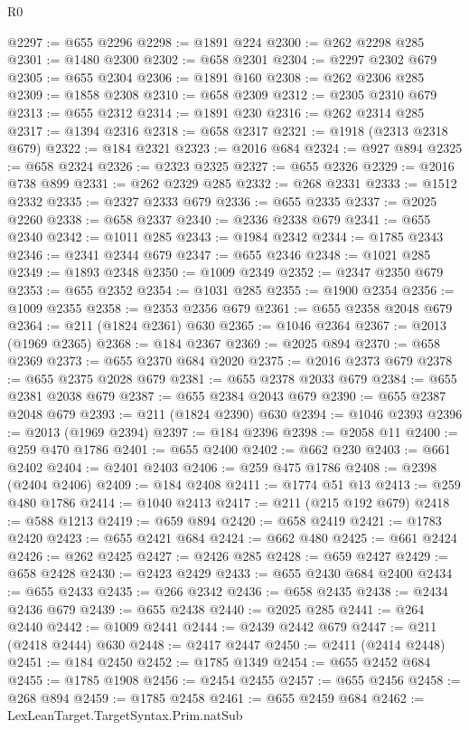 \begin{lexlean}{R0}
\begin{coremodule}
@2297 := @655 @2296
@2298 := @1891 @224
@2300 := @262 @2298 @285
@2301 := @1480 @2300
@2302 := @658 @2301
@2304 := @2297 @2302 @679
@2305 := @655 @2304
@2306 := @1891 @160
@2308 := @262 @2306 @285
@2309 := @1858 @2308
@2310 := @658 @2309
@2312 := @2305 @2310 @679
@2313 := @655 @2312
@2314 := @1891 @230
@2316 := @262 @2314 @285
@2317 := @1394 @2316
@2318 := @658 @2317
@2321 := @1918 (@2313 @2318 @679)
@2322 := @184 @2321
@2323 := @2016 @684
@2324 := @927 @894
@2325 := @658 @2324
@2326 := @2323 @2325
@2327 := @655 @2326
@2329 := @2016 @738 @899
@2331 := @262 @2329 @285
@2332 := @268 @2331
@2333 := @1512 @2332
@2335 := @2327 @2333 @679
@2336 := @655 @2335
@2337 := @2025 @2260
@2338 := @658 @2337
@2340 := @2336 @2338 @679
@2341 := @655 @2340
@2342 := @1011 @285
@2343 := @1984 @2342
@2344 := @1785 @2343
@2346 := @2341 @2344 @679
@2347 := @655 @2346
@2348 := @1021 @285
@2349 := @1893 @2348
@2350 := @1009 @2349
@2352 := @2347 @2350 @679
@2353 := @655 @2352
@2354 := @1031 @285
@2355 := @1900 @2354
@2356 := @1009 @2355
@2358 := @2353 @2356 @679
@2361 := @655 @2358 @2048 @679
@2364 := @211 (@1824 @2361) @630
@2365 := @1046 @2364
@2367 := @2013 (@1969 @2365)
@2368 := @184 @2367
@2369 := @2025 @894
@2370 := @658 @2369
@2373 := @655 @2370 @684 @2020
@2375 := @2016 @2373 @679
@2378 := @655 @2375 @2028 @679
@2381 := @655 @2378 @2033 @679
@2384 := @655 @2381 @2038 @679
@2387 := @655 @2384 @2043 @679
@2390 := @655 @2387 @2048 @679
@2393 := @211 (@1824 @2390) @630
@2394 := @1046 @2393
@2396 := @2013 (@1969 @2394)
@2397 := @184 @2396
@2398 := @2058 @11
@2400 := @259 @470 @1786
@2401 := @655 @2400
@2402 := @662 @230
@2403 := @661 @2402
@2404 := @2401 @2403
@2406 := @259 @475 @1786
@2408 := @2398 (@2404 @2406)
@2409 := @184 @2408
@2411 := @1774 @51 @13
@2413 := @259 @480 @1786
@2414 := @1040 @2413
@2417 := @211 (@215 @192 @679)
@2418 := @588 @1213
@2419 := @659 @894
@2420 := @658 @2419
@2421 := @1783 @2420
@2423 := @655 @2421 @684
@2424 := @662 @480
@2425 := @661 @2424
@2426 := @262 @2425
@2427 := @2426 @285
@2428 := @659 @2427
@2429 := @658 @2428
@2430 := @2423 @2429
@2433 := @655 @2430 @684 @2400
@2434 := @655 @2433
@2435 := @266 @2342
@2436 := @658 @2435
@2438 := @2434 @2436 @679
@2439 := @655 @2438
@2440 := @2025 @285
@2441 := @264 @2440
@2442 := @1009 @2441
@2444 := @2439 @2442 @679
@2447 := @211 (@2418 @2444) @630
@2448 := @2417 @2447
@2450 := @2411 (@2414 @2448)
@2451 := @184 @2450
@2452 := @1785 @1349
@2454 := @655 @2452 @684
@2455 := @1785 @1908
@2456 := @2454 @2455
@2457 := @655 @2456
@2458 := @268 @894
@2459 := @1785 @2458
@2461 := @655 @2459 @684
@2462 := LexLeanTarget.TargetSyntax.Prim.natSub

\end{coremodule}
\end{lexlean}
